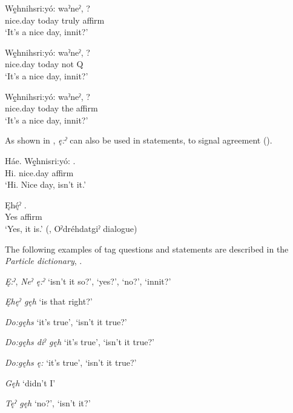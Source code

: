 \ea\label{ex:tagquesex201} 
\gll Wę̱hnihsri:yó: waˀneˀ, ? \\
nice.day today truly affirm\\
\glt ‘It’s a nice day, innit?’
\z


\ea\label{ex:tagquesex202} 
\gll Wę̱hnihsri:yó: waˀneˀ, ? \\
nice.day today not Q\\
\glt ‘It’s a nice day, innit?’
\z


\ea\label{ex:tagquesex203} 
\gll Wę̱hnihsri:yó: waˀneˀ, ?\\
nice.day today the affirm\\
\glt ‘It’s a nice day, innit?’ 
\z


As shown in , \textit{ę:ˀ} can also be used in statements, to signal agreement (). 

\ea\label{ex:tagquesex3}
\gll Háe. Wę̱hnisri:yó: .\\
Hi. nice.day affirm\\
\glt ‘Hi. Nice day, isn’t it.’

\gll Ęhę́ˀ .\\
Yes affirm\\
\glt ‘Yes, it is.’ (\cite[339]{mithun_watewayestanih_1984}, Oˀdréhdatgiˀ dialogue)
\z


The following examples of tag questions and statements are described in the \textit{Particle dictionary}, .

\begin{CayugaRelated}
\item{}\textit{Ę:ˀ}, \textit{Neˀ ę:ˀ} ‘isn't it so?’, ‘yes?’, ‘no?’, ‘innit?’\\
\item{}\textit{Ęhęˀ gęh} ‘is that right?’\\
\item{}\textit{Do:gęhs} ‘it's true’, ‘isn’t it true?’\\
\item{}\textit{Do:gęhs diˀ gęh} ‘it's true’, ‘isn’t it true?’\\
\item{}\textit{Do:gęhs ę:} ‘it's true’, ‘isn't it true?’\\
\item{}\textit{Gęh} ‘didn’t I’\\
\item{}\textit{Tęˀ gęh} ‘no?’, ‘isn’t it?’
\end{CayugaRelated}

